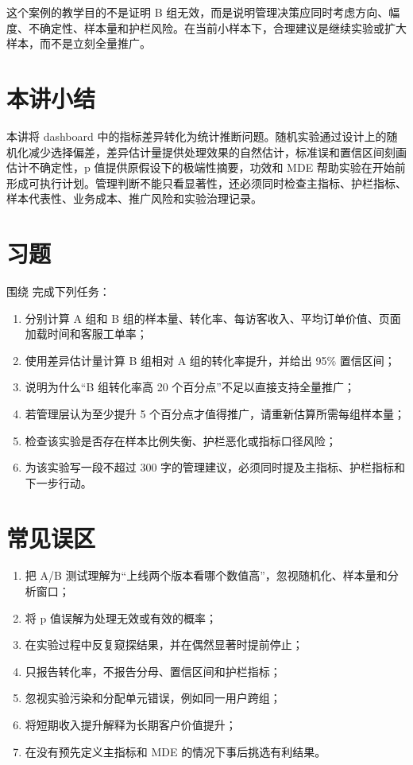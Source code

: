 \documentclass[UTF8,fontset=fandol,openany,zihao=-4]{ctexbook}
\begin{document}
这个案例的教学目的不是证明 B 组无效，而是说明管理决策应同时考虑方向、幅度、不确定性、样本量和护栏风险。在当前小样本下，合理建议是继续实验或扩大样本，而不是立刻全量推广。

\section*{本讲小结}

本讲将 dashboard 中的指标差异转化为统计推断问题。随机实验通过设计上的随机化减少选择偏差，差异估计量提供处理效果的自然估计，标准误和置信区间刻画估计不确定性，p 值提供原假设下的极端性摘要，功效和 MDE 帮助实验在开始前形成可执行计划。管理判断不能只看显著性，还必须同时检查主指标、护栏指标、样本代表性、业务成本、推广风险和实验治理记录。

\section*{习题}

\begin{exercise}
围绕  完成下列任务：
\begin{enumerate}
  \item 分别计算 A 组和 B 组的样本量、转化率、每访客收入、平均订单价值、页面加载时间和客服工单率；
  \item 使用差异估计量计算 B 组相对 A 组的转化率提升，并给出 95\% 置信区间；
  \item 说明为什么“B 组转化率高 20 个百分点”不足以直接支持全量推广；
  \item 若管理层认为至少提升 5 个百分点才值得推广，请重新估算所需每组样本量；
  \item 检查该实验是否存在样本比例失衡、护栏恶化或指标口径风险；
  \item 为该实验写一段不超过 300 字的管理建议，必须同时提及主指标、护栏指标和下一步行动。
\end{enumerate}
\end{exercise}

\section*{常见误区}

\begin{enumerate}
  \item 把 A/B 测试理解为“上线两个版本看哪个数值高”，忽视随机化、样本量和分析窗口；
  \item 将 p 值误解为处理无效或有效的概率；
  \item 在实验过程中反复窥探结果，并在偶然显著时提前停止；
  \item 只报告转化率，不报告分母、置信区间和护栏指标；
  \item 忽视实验污染和分配单元错误，例如同一用户跨组；
  \item 将短期收入提升解释为长期客户价值提升；
  \item 在没有预先定义主指标和 MDE 的情况下事后挑选有利结果。
\end{enumerate}
\end{document}
